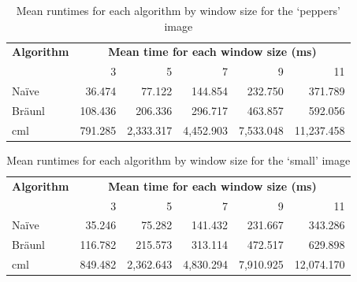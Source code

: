\begin{table}
\centering
\caption[Mean runtimes for each algorithm for the `peppers' image]{
\label{tab:median:peppers}Mean runtimes for each algorithm by window size for the `peppers' image}
\begin{tabular}{@{}lrrrrr@{}}
\toprule
\multicolumn{1}{c}{\textbf{Algorithm}} & \multicolumn{5}{c}{\textbf{Mean time for each window size (ms)}}  \\
                              & 3       & 5         & 7         & 9         & 11         \\ \midrule
Naïve                         & 36.474  & 77.122    & 144.854   & 232.750   & 371.789    \\
Bräunl                        & 108.436 & 206.336   & 296.717   & 463.857   & 592.056    \\
\gls{cml}                           & 791.285 & 2,333.317 & 4,452.903 & 7,533.048 & 11,237.458 \\ \bottomrule
\end{tabular}
\end{table}

\begin{table}
\centering
\caption[Mean runtimes for each algorithm for the `small' image]{Mean runtimes for each algorithm by window size for the `small' image}
\label{tab:median:small}
\begin{tabular}{@{}lrrrrr@{}}
\toprule
\multicolumn{1}{c}{\textbf{Algorithm}} & \multicolumn{5}{c}{\textbf{Mean time for each window size (ms)}}  \\
                              & 3       & 5         & 7         & 9         & 11         \\ \midrule
Naïve                         & 35.246  & 75.282    & 141.432   & 231.667   & 343.286    \\
Bräunl                        & 116.782 & 215.573   & 313.114   & 472.517   & 629.898    \\
\gls{cml}                           & 849.482 & 2,362.643 & 4,830.294 & 7,910.925 & 12,074.170 \\ \bottomrule
\end{tabular}
\end{table}

